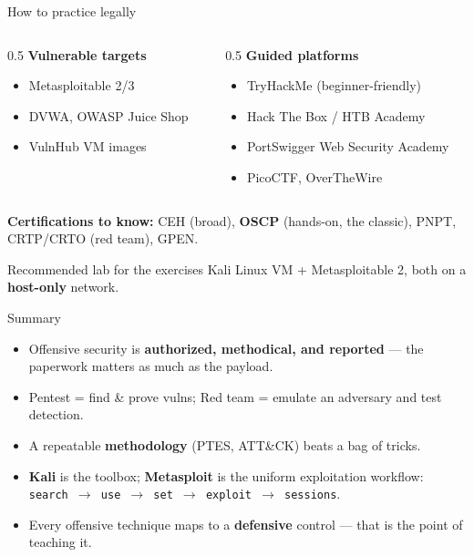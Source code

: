 \documentclass[aspectratio=169,11pt]{beamer}
\begin{document}
\begin{frame}{How to practice legally}
  \begin{columns}[T]
    \begin{column}{0.5\textwidth}
      \textbf{Vulnerable targets}
      \begin{itemize}\footnotesize
        \item Metasploitable 2/3
        \item DVWA, OWASP Juice Shop
        \item VulnHub VM images
      \end{itemize}
    \end{column}
    \begin{column}{0.5\textwidth}
      \textbf{Guided platforms}
      \begin{itemize}\footnotesize
        \item TryHackMe (beginner-friendly)
        \item Hack The Box / HTB Academy
        \item PortSwigger Web Security Academy
        \item PicoCTF, OverTheWire
      \end{itemize}
    \end{column}
  \end{columns}
  \vspace{0.5em}
  \textbf{Certifications to know:} CEH (broad), \textbf{OSCP} (hands-on, the
  classic), PNPT, CRTP/CRTO (red team), GPEN.
  \begin{block}{Recommended lab for the exercises}
    Kali Linux VM + Metasploitable 2, both on a \textbf{host-only} network.
  \end{block}
\end{frame}

\begin{frame}{Summary}
  \begin{itemize}
    \item Offensive security is \textbf{authorized, methodical, and reported} ---
          the paperwork matters as much as the payload.
    \item Pentest = find \& prove vulns; Red team = emulate an adversary and
          test detection.
    \item A repeatable \textbf{methodology} (PTES, ATT\&CK) beats a bag of tricks.
    \item \textbf{Kali} is the toolbox; \textbf{Metasploit} is the uniform
          exploitation workflow: \texttt{search $\to$ use $\to$ set $\to$ exploit
          $\to$ sessions}.
    \item Every offensive technique maps to a \textbf{defensive} control ---
          that is the point of teaching it.
  \end{itemize}
\end{frame}
\end{document}
